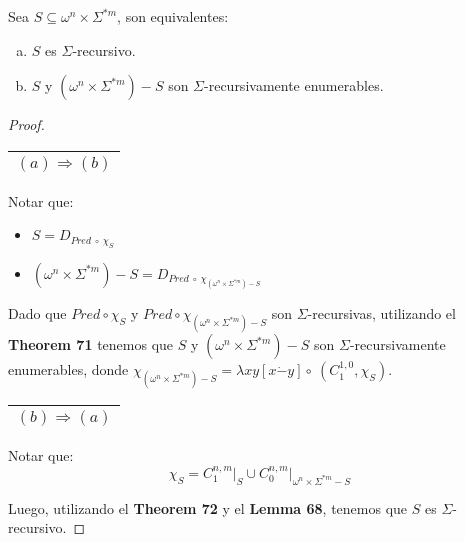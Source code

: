   \begin{theorem}
    \PN Sea $S \subseteq \omega^{n} \times \Sigma^{\ast m}$, son equivalentes:
    \begin{enumerate}[a)]
      \item $S$ es $\Sigma$-recursivo.
      \item $S$ y $(\omega^{n} \times \Sigma^{\ast m}) - S$ son $\Sigma$-recursivamente enumerables.
    \end{enumerate}
  \end{theorem}
  \begin{proof}
    \begin{tabular}{|c|} \hline $(a) \Rightarrow (b)$ \\\hline \end{tabular}

    \vspace{3mm}
    \PN Notar que:
    \begin{itemize}
      \item $S = D_{Pred\ \circ\ \chi_{S}}$
      \item $(\omega^{n} \times \Sigma^{\ast m}) - S = D_{Pred\ \circ\ \chi_{(\omega^{n} \times \Sigma^{\ast m})-S}}$
    \end{itemize}

    \PN Dado que $Pred \circ \chi_{S}$ y $Pred \circ \chi_{(\omega^{n} \times \Sigma^{\ast m})-S}$ son
    $\Sigma$-recursivas, utilizando el \textbf{Theorem 71} tenemos que $S$ y $(\omega^{n} \times \Sigma^{\ast m}) - S$
    son $\Sigma$-recursivamente enumerables, donde $\chi_{(\omega^{n} \times \Sigma^{\ast m}) - S} = \lambda xy \left[x
    \dot{-}y\right] \circ\ (C_{1}^{1,0},\chi_S)$.

    \vspace{3mm}
    \PN \begin{tabular}{|c|} \hline $(b) \Rightarrow (a)$ \\\hline \end{tabular}
    \vspace{3mm}
    \PN Notar que:
    \[
      \chi_{S} = C_{1}^{n,m}\mathrm{\mid}_{S} \cup C_{0}^{n,m}\mathrm{\mid}_{\omega^{n} \times \Sigma^{\ast m} - S}
    \]

    \PN Luego, utilizando el \textbf{Theorem 72} y el \textbf{Lemma 68}, tenemos que $S$ es $\Sigma$-recursivo.
  \end{proof}

